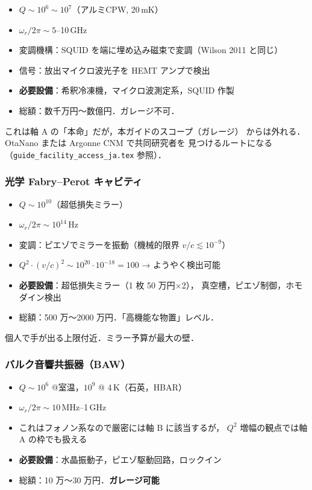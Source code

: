 \documentclass[11pt,a4paper]{article}
\begin{document}
\begin{itemize}
\item $Q \sim 10^6 \sim 10^7$（アルミCPW, 20\,mK）
\item $\omega_r/2\pi \sim 5$--10\,GHz
\item 変調機構：SQUID を端に埋め込み磁束で変調（Wilson 2011 と同じ）
\item 信号：放出マイクロ波光子を HEMT アンプで検出
\item \textbf{必要設備}：希釈冷凍機，マイクロ波測定系，SQUID 作製
\item 総額：数千万円〜数億円．ガレージ不可．
\end{itemize}

これは軸 A の「本命」だが，本ガイドのスコープ（ガレージ）
からは外れる．OtaNano または Argonne CNM で共同研究者を
見つけるルートになる（\texttt{guide\_facility\_access\_ja.tex} 参照）．

\subsubsection{光学 Fabry--Perot キャビティ}

\begin{itemize}
\item $Q \sim 10^{10}$（超低損失ミラー）
\item $\omega_r/2\pi \sim 10^{14}$\,Hz
\item 変調：ピエゾでミラーを振動（機械的限界 $v/c \lesssim 10^{-9}$）
\item $Q^2 \cdot (v/c)^2 \sim 10^{20} \cdot 10^{-18} = 100$ → ようやく検出可能
\item \textbf{必要設備}：超低損失ミラー（1 枚 50 万円×2），
真空槽，ピエゾ制御，ホモダイン検出
\item 総額：500 万〜2000 万円．「高機能な物置」レベル．
\end{itemize}

個人で手が出る上限付近．ミラー予算が最大の壁．

\subsubsection{バルク音響共振器（BAW）}

\begin{itemize}
\item $Q \sim 10^6$ @室温，$10^9$ @ 4\,K（石英，HBAR）
\item $\omega_r/2\pi \sim 10$\,MHz--1\,GHz
\item これはフォノン系なので厳密には軸 B に該当するが，
$Q^2$ 増幅の観点では軸 A の枠でも扱える
\item \textbf{必要設備}：水晶振動子，ピエゾ駆動回路，ロックイン
\item 総額：10 万〜30 万円．\textbf{ガレージ可能}
\end{itemize}
\end{document}
